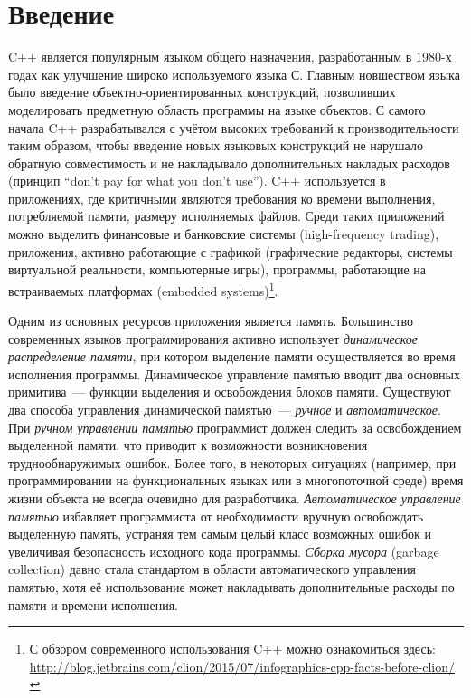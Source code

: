 \section*{Введение}

C++ является популярным языком общего назначения, разработанным в 1980-х 
годах как улучшение широко используемого языка С. 
Главным новшеством языка было введение объектно-ориентированных конструкций, 
позволивших моделировать предметную область программы на языке объектов. 
С самого начала C++ разрабатывался с учётом высоких требований к производительности 
таким образом, чтобы введение новых языковых конструкций не нарушало обратную совместимость 
и не накладывало дополнительных накладых расходов (принцип ``don't pay for what you don't use''). 
C++ используется в приложениях, где критичными являются требования ко времени выполнения, 
потребляемой памяти, размеру исполняемых файлов. 
Среди таких приложений можно выделить финансовые и банковские системы (high-frequency trading), 
приложения, активно работающие с графикой (графические редакторы, системы виртуальной реальности, 
компьютерные игры), программы, работающие на встраиваемых платформах (embedded systems)\footnote{С обзором современного использования C++ можно ознакомиться здесь: 
\url{http://blog.jetbrains.com/clion/2015/07/infographics-cpp-facts-before-clion/}}.

Одним из основных ресурсов приложения является память. 
Большинство современных языков программирования активно использует \emph{динамическое 
распределение памяти}, при котором выделение памяти осуществляется во время исполнения программы. 
Динамическое управление памятью вводит два основных примитива~--- функции выделения и 
освобождения блоков памяти. 
Существуют два способа управления динамической памятью~--- \emph{ручное} и \emph{автоматическое}. 
При \emph{ручном управлении памятью} программист должен следить за освобождением выделенной 
памяти, что приводит к возможности возникновения труднообнаружимых ошибок. 
Более того, в некоторых ситуациях (например, при программировании на функциональных языках или 
в многопоточной среде) время жизни объекта не всегда очевидно для разработчика. 
\emph{Автоматическое управление памятью} избавляет программиста от необходимости вручную 
освобождать выделенную память, устраняя тем самым целый класс возможных ошибок и увеличивая 
безопасность исходного кода программы. 
\emph{Сборка мусора} (garbage collection) давно стала стандартом в области автоматического 
управления памятью, хотя её использование может накладывать дополнительные расходы по памяти 
и времени исполнения.

